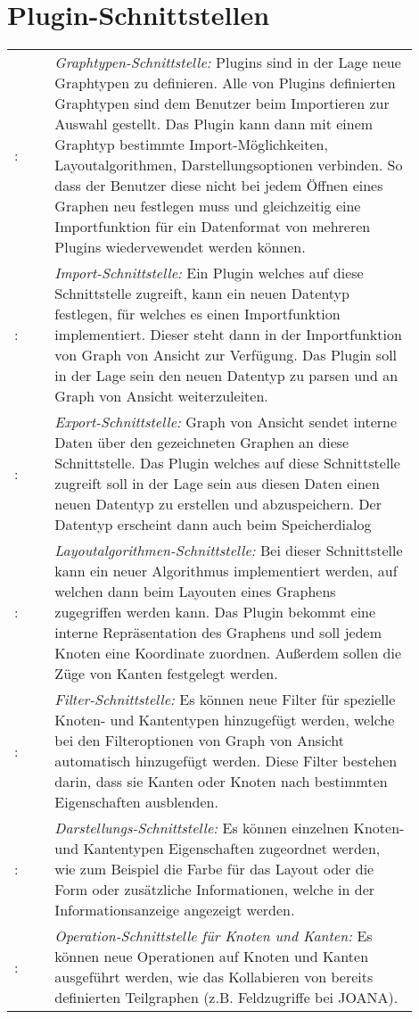 \chapter{Plugin-Schnittstellen}
\label{ch:plugschnitt}

\setcounter{psnr}{10}
\newcommand{\psno}{\ifnum\value{psnr}<10 00\else\ifnum\value{psnr}<100 0\fi\fi\arabic{psnr}\addtocounter{psnr}{10}}
\renewcommand\thesubsubsection{/S\ifnum\value{psnr}<10 000\else\ifnum\value{psnr}<100 00\else\ifnum\value{psnr}<1000 0\fi\fi\fi\arabic{psnr}/}
\newcommand\ps[2]{\namedlabel{s:#1}{\textbf{/S\psno/}}: & #2 \\ [1ex] }

\begin{tabular}{lp{0.9\linewidth}}
  \ps{graphtyp}{\textit{Graphtypen-Schnittstelle:} Plugins sind in der Lage neue Graphtypen zu definieren. Alle von Plugins definierten Graphtypen sind dem Benutzer beim Importieren zur Auswahl gestellt. Das Plugin kann dann mit einem Graphtyp bestimmte Import-Möglichkeiten, Layoutalgorithmen, Darstellungsoptionen verbinden.
So dass der Benutzer diese nicht bei jedem Öffnen eines Graphen neu festlegen muss und gleichzeitig eine Importfunktion für ein Datenformat von mehreren Plugins wiedervewendet werden können.}
  \ps{import}{\textit{Import-Schnittstelle:} Ein Plugin welches auf diese Schnittstelle zugreift, kann ein neuen Datentyp festlegen, für welches es einen Importfunktion implementiert. Dieser steht dann in der Importfunktion von Graph von Ansicht zur Verfügung. Das Plugin soll in der Lage sein den neuen Datentyp zu parsen und an Graph von Ansicht weiterzuleiten.}
  \ps{export}{\textit{Export-Schnittstelle:} Graph von Ansicht sendet interne Daten über den gezeichneten Graphen an diese Schnittstelle. Das Plugin welches auf diese Schnittstelle zugreift soll in der Lage sein aus diesen Daten einen neuen Datentyp zu erstellen und abzuspeichern. Der Datentyp erscheint dann auch beim Speicherdialog}
  \ps{layoutalgo}{\textit{Layoutalgorithmen-Schnittstelle:} Bei dieser Schnittstelle kann ein neuer Algorithmus implementiert werden, auf welchen dann beim Layouten eines Graphens zugegriffen werden kann. Das Plugin bekommt eine interne Repräsentation des Graphens und soll jedem Knoten eine Koordinate zuordnen. Außerdem sollen die Züge von Kanten festgelegt werden.}
  \ps{filter}{\textit{Filter-Schnittstelle:} Es können neue Filter für spezielle Knoten- und Kantentypen hinzugefügt werden, welche bei den Filteroptionen von Graph von Ansicht automatisch hinzugefügt werden. Diese Filter bestehen darin, dass sie Kanten oder Knoten nach bestimmten Eigenschaften ausblenden.}
  \ps{darstellung}{\textit{Darstellungs-Schnittstelle:} Es können einzelnen Knoten- und Kantentypen Eigenschaften zugeordnet werden, wie zum Beispiel die Farbe für das Layout oder die Form oder zusätzliche Informationen, welche in der Informationsanzeige angezeigt werden.}
  \ps{operationen}{\textit{Operation-Schnittstelle für Knoten und Kanten:} Es können neue Operationen auf Knoten und Kanten ausgeführt werden, wie das Kollabieren von bereits definierten Teilgraphen (z.B. Feldzugriffe bei JOANA).}
\end{tabular}
